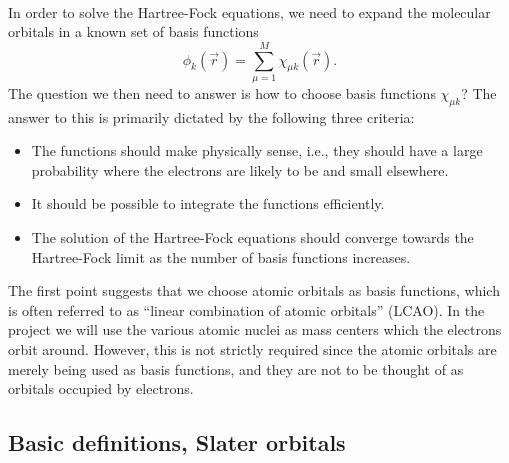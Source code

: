 \documentclass[%
twoside,                 %
final,                   %
10pt]{article}
\begin{document}
\paragraph{}

In order to solve the Hartree-Fock equations, we need to expand the molecular orbitals in a known
set of basis functions
\begin{equation}
 \phi_k(\vec r) = \sum_{\mu=1}^M\chi_{\mu k}(\vec r).
\end{equation}
The question we then need to answer is how to choose basis functions $\chi_{\mu k}$? The answer to this
is primarily dictated by the following three criteria:

\begin{itemize}
  \item The functions should make physically sense, i.e., they should have a large probability where   the electrons are likely to be and small elsewhere.

  \item It should be possible to integrate the functions efficiently.

  \item The solution of the Hartree-Fock equations should converge towards the Hartree-Fock limit        as the number of basis functions increases.
\end{itemize}

\noindent
The first point suggests that we choose atomic orbitals as basis functions,  which is often
referred to as ``linear combination of atomic orbitals'' (LCAO). In the project we will use the various atomic nuclei as mass centers which the electrons orbit around. However, this is not strictly required since the
atomic orbitals are merely being used as basis functions, and they are not to be thought of
as orbitals occupied by electrons.



\subsection{Basic definitions, Slater orbitals}

\paragraph{}
\end{document}
